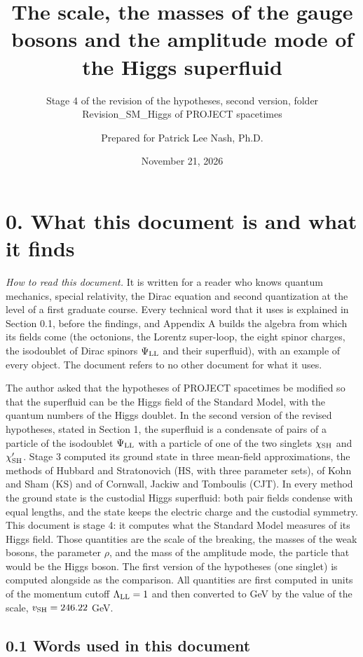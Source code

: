 \documentclass[
  10pt,
]{article}
\title{The scale, the masses of the gauge bosons and the amplitude mode
of the Higgs superfluid}
\subtitle{Stage 4 of the revision of the hypotheses, second version,
folder Revision\_SM\_Higgs of PROJECT spacetimes}
\author{Prepared for Patrick Lee Nash, Ph.D.}
\date{November 21, 2026}
\begin{document}
\maketitle

\hypertarget{what-this-document-is-and-what-it-finds}{%
\section{0. What this document is and what it
finds}\label{what-this-document-is-and-what-it-finds}}

\emph{How to read this document.} It is written for a reader who knows
quantum mechanics, special relativity, the Dirac equation and second
quantization at the level of a first graduate course. Every technical
word that it uses is explained in Section 0.1, before the findings, and
Appendix A builds the algebra from which its fields come (the octonions,
the Lorentz super-loop, the eight spinor charges, the isodoublet of
Dirac spinors \(\Psi_{\rm LL}\) and their superfluid), with an example
of every object. The document refers to no other document for what it
uses.

The author asked that the hypotheses of PROJECT spacetimes be modified
so that the superfluid can be the Higgs field of the Standard Model,
with the quantum numbers of the Higgs doublet. In the second version of
the revised hypotheses, stated in Section 1, the superfluid is a
condensate of pairs of a particle of the isodoublet \(\Psi_{\rm LL}\)
with a particle of one of the two singlets \(\chi_{\rm SH}\) and
\(\chi'_{\rm SH}\). Stage 3 computed its ground state in three
mean-field approximations, the methods of Hubbard and Stratonovich (HS,
with three parameter sets), of Kohn and Sham (KS) and of Cornwall,
Jackiw and Tomboulis (CJT). In every method the ground state is the
custodial Higgs superfluid: both pair fields condense with equal
lengths, and the state keeps the electric charge and the custodial
symmetry. This document is stage 4: it computes what the Standard Model
measures of its Higgs field. Those quantities are the scale of the
breaking, the masses of the weak bosons, the parameter \(\rho\), and the
mass of the amplitude mode, the particle that would be the Higgs boson.
The first version of the hypotheses (one singlet) is computed alongside
as the comparison. All quantities are first computed in units of the
momentum cutoff \(\Lambda_{\rm LL}=1\) and then converted to GeV by the
value of the scale, \(v_{\rm SH}=246.22\) GeV.

\hypertarget{words-used-in-this-document}{%
\subsection{0.1 Words used in this
document}\label{words-used-in-this-document}}
\end{document}
